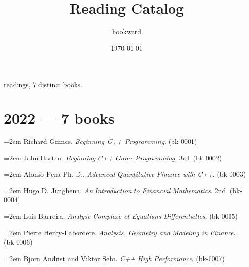 \documentclass[11pt,a4paper]{article}
\title{Reading Catalog}
\author{bookward}
\date{\today}
\begin{document}
 readings, 7 distinct books.
\section*{2022 --- 7 books}
\noindent\hangindent=2em Richard Grimes. \emph{Beginning C++ Programming}. (bk-0001)\par\medskip
\noindent\hangindent=2em John Horton. \emph{Beginning C++ Game Programming}. 3rd. (bk-0002)\par\medskip
\noindent\hangindent=2em Alonso Pena Ph. D.. \emph{Advanced Quantitative Finance with C++}. (bk-0003)\par\medskip
\noindent\hangindent=2em Hugo D. Junghenn. \emph{An Introduction to Financial Mathematics}. 2nd. (bk-0004)\par\medskip
\noindent\hangindent=2em Luis Barreira. \emph{Analyse Complexe et Equations Differentielles}. (bk-0005)\par\medskip
\noindent\hangindent=2em Pierre Henry-Labordere. \emph{Analysis, Geometry and Modeling in Finance}. (bk-0006)\par\medskip
\noindent\hangindent=2em Bjorn Andrist and Viktor Sehr. \emph{C++ High Performance}. (bk-0007)\par\medskip
\end{document}
